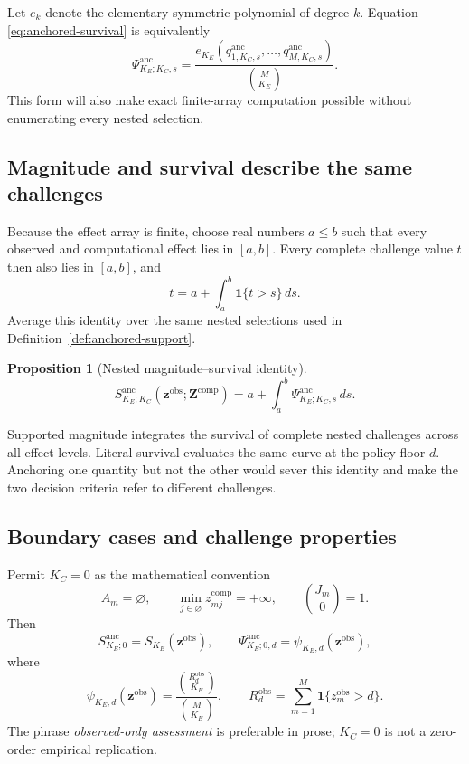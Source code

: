 \documentclass[11pt]{article}
\newcommand{\Sanc}{S^{\mathrm{anc}}}
\newcommand{\Psianc}{\Psi^{\mathrm{anc}}}
\newtheorem{proposition}{Proposition}
\theoremstyle{remark}
\begin{document}
Let $e_k$ denote the elementary symmetric polynomial of degree $k$. Equation
\eqref{eq:anchored-survival} is equivalently
\begin{equation}
\Psianc_{K_E;K_C,s}
=
\frac{e_{K_E}\left(
q^{\mathrm{anc}}_{1,K_C,s},\ldots,
q^{\mathrm{anc}}_{M,K_C,s}
\right)}{\binom{M}{K_E}}.
\label{eq:elementary-symmetric}
\end{equation}
This form will also make exact finite-array computation possible without
enumerating every nested selection.

\subsection{Magnitude and survival describe the same challenges}

Because the effect array is finite, choose real numbers $a\leq b$ such that
every observed and computational effect lies in $[a,b]$. Every complete
challenge value $t$ then also lies in $[a,b]$, and
\[
t=a+\int_a^b\mathbf 1\{t>s\}\,ds.
\]
Average this identity over the same nested selections used in
Definition~\ref{def:anchored-support}.

\begin{proposition}[Nested magnitude--survival identity]
\label{prop:survival-identity}
\begin{equation}
\Sanc_{K_E;K_C}
\left(\mathbf z^{\mathrm{obs}};\mathbf Z^{\mathrm{comp}}\right)
=
a+
\int_a^b
\Psianc_{K_E;K_C,s}\,ds.
\label{eq:nested-survival-identity}
\end{equation}
\end{proposition}

Supported magnitude integrates the survival of complete nested challenges
across all effect levels. Literal survival evaluates the same curve at the
policy floor $d$. Anchoring one quantity but not the other would sever this
identity and make the two decision criteria refer to different challenges.

\subsection{Boundary cases and challenge properties}
\label{sec:properties}

Permit $K_C=0$ as the mathematical convention
\[
A_m=\varnothing,
\qquad
\min_{j\in\varnothing}z_{mj}^{\mathrm{comp}}=+\infty,
\qquad
\binom{J_m}{0}=1.
\]
Then
\begin{equation}
\Sanc_{K_E;0}
=S_{K_E}(\mathbf z^{\mathrm{obs}}),
\qquad
\Psianc_{K_E;0,d}
=\psi_{K_E,d}(\mathbf z^{\mathrm{obs}}),
\label{eq:observed-boundary}
\end{equation}
where
\[
\psi_{K_E,d}(\mathbf z^{\mathrm{obs}})
=
\frac{\binom{R_d^{\mathrm{obs}}}{K_E}}
{\binom{M}{K_E}},
\qquad
R_d^{\mathrm{obs}}
=
\sum_{m=1}^M\mathbf 1\{z_m^{\mathrm{obs}}>d\}.
\]
The phrase \emph{observed-only assessment} is preferable in prose;
$K_C=0$ is not a zero-order empirical replication.
\end{document}
